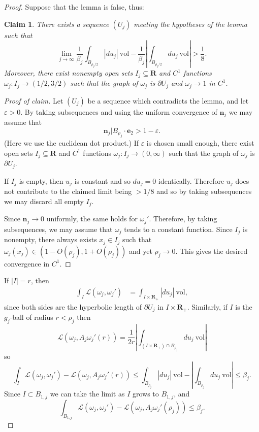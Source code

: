 \documentclass[reqno,12pt,letterpaper]{amsart}
\newcommand{\RR}{\mathbf{R}}
\newcommand{\evect}{\mathbf e}
\newcommand{\normal}{\mathbf n}
\newcommand{\vol}{\mathrm{vol}}
\newtheorem{claim}[theorem]{Claim}
\theoremstyle{definition}
\numberwithin{equation}{section}
\begin{document}
\begin{proof}
Suppose that the lemma is false, thus:

\begin{claim}
There exists a sequence $(U_j)$ meeting the hypotheses of the lemma such that
$$\lim_{j \to \infty} \frac{1}{\beta_j} \int_{B_{\rho_j/2}} |du_j| ~\vol - \frac{1}{\beta_j}\left|\int_{B_{\rho_j/2}} du_j ~\vol\right| > \frac{1}{8}.$$
Moreover, there exist nonempty open sets $I_j \subseteq \RR$ and $C^1$ functions $\omega_j: I_j \to (1/2, 3/2)$ such that the graph of $\omega_j$ is $\partial U_j$ and $\omega_j \to 1$ in $C^1$.
\end{claim}
\begin{proof}[Proof of claim]
Let $(U_j)$ be a sequence which contradicts the lemma, and let $\varepsilon > 0$.
By taking subsequences and using the uniform convergence of $\normal_j$ we may assume that
$$\normal_j|B_{\rho_j} \cdot \evect_2 > 1 - \varepsilon.$$
(Here we use the euclidean dot product.)
If $\varepsilon$ is chosen small enough, there exist open sets $I_j \subseteq \RR$ and $C^1$ functions $\omega_j: I_j \to (0, \infty)$ such that the graph of $\omega_j$ is $\partial U_j$.

If $I_j$ is empty, then $u_j$ is constant and so $du_j = 0$ identically.
Therefore $u_j$ does not contribute to the claimed limit being $> 1/8$ and so by taking subsequences we may discard all empty $I_j$.

Since $\normal_j \to 0$ uniformly, the same holds for $\omega_j'$.
Therefore, by taking subsequences, we may assume that $\omega_j$ tends to a constant function.
Since $I_j$ is nonempty, there always exists $x_j \in I_j$ such that $\omega_j(x_j) \in (1 - O(\rho_j), 1 + O(\rho_j))$ and yet $\rho_j \to 0$.
This gives the desired convergence in $C^1$.
\end{proof}

If $|I| = r$, then
\begin{align*}
\int_I \mathscr L(\omega_j, \omega_j') &= \int_{I \times \RR_+} |du_j| ~\vol,
\end{align*}
since both sides are the hyperbolic length of $\partial U_j$ in $I \times \RR_+$.
Similarly, if $I$ is the $g_j$-ball of radius $r < \rho_j$ then
$$\mathscr L(\omega_j, A_j \omega_j'(r)) = \frac{1}{2r} \left|\int_{(I \times \RR_+) \cap B_{\rho_j}} du_j ~\vol\right|$$
so
$$\int_I \mathscr L(\omega_j, \omega_j') - \mathscr L(\omega_j, A_j \omega_j'(r)) \leq \int_{B_{\rho_j}} |du_j| ~\vol - \left|\int_{B_{\rho_j}} du_j ~\vol\right| \leq \beta_j.$$
Since $I \subset B_{1, j}$ we can take the limit as $I$ grows to $B_{1, j}$, and
$$\int_{B_{1, j}} \mathscr L(\omega_j, \omega_j') - \mathscr L(\omega_j, A_j \omega_j'(\rho_j)) \leq \beta_j.$$


\end{proof}
\end{document}

